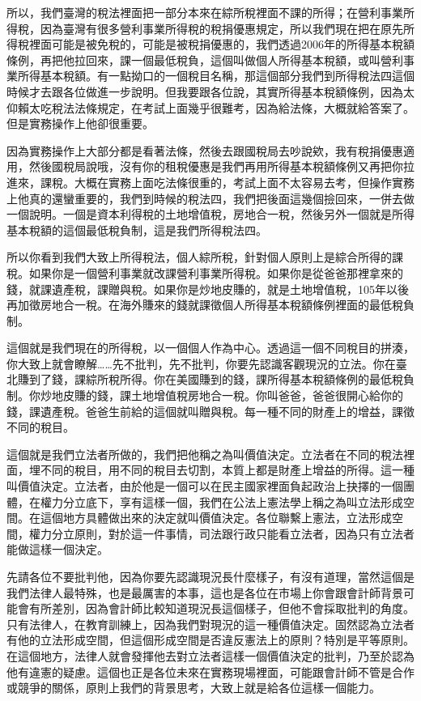 \documentclass[oneside,sub3section]{ctexbook}
\begin{document}
所以，我們臺灣的稅法裡面把一部分本來在綜所稅裡面不課的所得；在營利事業所得稅，因為臺灣有很多營利事業所得稅的稅捐優惠規定，所以我們現在把在原先所得稅裡面可能是被免稅的，可能是被稅捐優惠的，我們透過2006年的所得基本稅額條例，再把他拉回來，課一個最低稅負，這個叫做個人所得基本稅額，或叫營利事業所得基本稅額。有一點拗口的一個稅目名稱，那這個部分我們到所得稅法四這個時候才去跟各位做進一步說明。但我要跟各位說，其實所得基本稅額條例，因為太仰賴太吃稅法法條規定，在考試上面幾乎很難考，因為給法條，大概就給答案了。但是實務操作上他卻很重要。

因為實務操作上大部分都是看著法條，然後去跟國稅局去吵說欸，我有稅捐優惠適用，然後國稅局說哦，沒有你的租稅優惠是我們再用所得基本稅額條例又再把你拉進來，課稅。大概在實務上面吃法條很重的，考試上面不太容易去考，但操作實務上他真的還蠻重要的，我們到時候的稅法四，我們把後面這幾個撿回來，一併去做一個說明。一個是資本利得稅的土地增值稅，房地合一稅，然後另外一個就是所得基本稅額的這個最低稅負制，這是我們所得稅法四。

所以你看到我們大致上所得稅法，個人綜所稅，針對個人原則上是綜合所得的課稅。如果你是一個營利事業就改課營利事業所得稅。如果你是從爸爸那裡拿來的錢，就課遺產稅，課贈與稅。如果你是炒地皮賺的，就是土地增值稅，105年以後再加徵房地合一稅。在海外賺來的錢就課徵個人所得基本稅額條例裡面的最低稅負制。

這個就是我們現在的所得稅，以一個個人作為中心。透過這一個不同稅目的拼湊，你大致上就會瞭解\ldots\ldots 先不批判，先不批判，你要先認識客觀現況的立法。你在臺北賺到了錢，課綜所稅所得。你在美國賺到的錢，課所得基本稅額條例的最低稅負制。你炒地皮賺的錢，課土地增值稅房地合一稅。你叫爸爸，爸爸很開心給你的錢，課遺產稅。爸爸生前給的這個就叫贈與稅。每一種不同的財產上的增益，課徵不同的稅目。

這個就是我們立法者所做的，我們把他稱之為叫價值決定。立法者在不同的稅法裡面，埋不同的稅目，用不同的稅目去切割，本質上都是財產上增益的所得。這一種叫價值決定。立法者，由於他是一個可以在民主國家裡面負起政治上抉擇的一個團體，在權力分立底下，享有這樣一個，我們在公法上憲法學上稱之為叫立法形成空間。在這個地方具體做出來的決定就叫價值決定。各位聯繫上憲法，立法形成空間，權力分立原則，對於這一件事情，司法跟行政只能看立法者，因為只有立法者能做這樣一個決定。

先請各位不要批判他，因為你要先認識現況長什麼樣子，有沒有道理，當然這個是我們法律人最特殊，也是最厲害的本事，這也是各位在市場上你會跟會計師背景可能會有所差別，因為會計師比較知道現況長這個樣子，但他不會採取批判的角度。只有法律人，在教育訓練上，因為我們對現況的這一種價值決定。固然認為立法者有他的立法形成空間，但這個形成空間是否違反憲法上的原則？特別是平等原則。在這個地方，法律人就會發揮他去對立法者這樣一個價值決定的批判，乃至於認為他有違憲的疑慮。這個也正是各位未來在實務現場裡面，可能跟會計師不管是合作或競爭的關係，原則上我們的背景思考，大致上就是給各位這樣一個能力。
\end{document}
